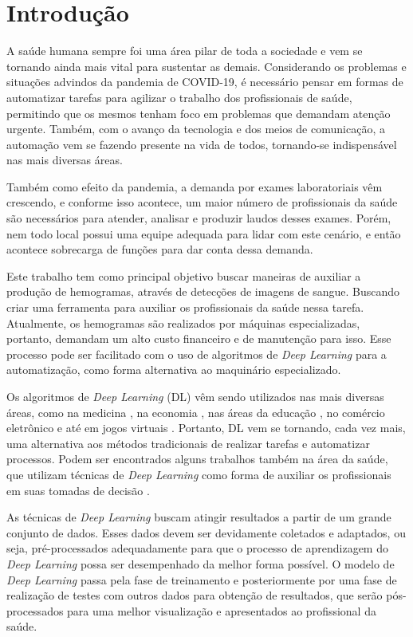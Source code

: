 \chapter{Introdução}
\label{chap:introducao}
A saúde humana sempre foi uma área pilar de toda a sociedade e vem se tornando ainda mais vital para sustentar as demais. Considerando os problemas e situações advindos da pandemia de COVID-19, é necessário pensar em formas de automatizar tarefas para agilizar o trabalho dos profissionais de saúde, permitindo que os mesmos tenham foco em problemas que demandam atenção urgente. Também, com o avanço da tecnologia e dos meios de comunicação, a automação vem se fazendo presente na vida de todos, tornando-se indispensável nas mais diversas áreas.

Também como efeito da pandemia, a demanda por exames laboratoriais vêm crescendo, e conforme isso acontece, um maior número de profissionais da saúde são necessários para atender, analisar e produzir laudos desses exames. Porém, nem todo local possui uma equipe adequada para lidar com este cenário, e então acontece sobrecarga de funções para dar conta dessa demanda.

Este trabalho tem como principal objetivo buscar maneiras de auxiliar a produção de hemogramas, através de detecções de imagens de sangue. Buscando criar uma ferramenta para auxiliar os profissionais da saúde nessa tarefa. Atualmente, os hemogramas são realizados por máquinas especializadas, portanto, demandam um alto custo financeiro e de manutenção para isso. Esse processo pode ser facilitado com o uso de algoritmos de \emph{Deep Learning} para a automatização, como forma alternativa ao maquinário especializado.

Os algoritmos de \emph{Deep Learning} (DL) vêm sendo utilizados nas mais diversas áreas, como na medicina \cite{deepLearningMedicine}, na economia \cite{deepLearningEconomy}, nas áreas da educação \cite{deepLearningEducation}, no comércio eletrônico \cite{deepLearningEcommerce} e até em jogos virtuais \cite{deepLearningGaming}. Portanto, DL vem se tornando, cada vez mais, uma alternativa aos métodos tradicionais de realizar tarefas e automatizar processos. Podem ser encontrados alguns trabalhos também na área da saúde, que utilizam técnicas de \emph{Deep Learning} como forma de auxiliar os profissionais em suas tomadas de decisão \cite{deepLearningHealth1, deepLearningHealth2}.

As técnicas de \emph{Deep Learning} buscam atingir resultados a partir de um grande conjunto de dados. Esses dados devem ser devidamente coletados e adaptados, ou seja, pré-processados adequadamente para que o processo de aprendizagem do \emph{Deep Learning} possa ser desempenhado da melhor forma possível. O modelo de \emph{Deep Learning} passa pela fase de treinamento e posteriormente por uma fase de realização de testes com outros dados para obtenção de resultados, que serão pós-processados para uma melhor visualização e apresentados ao profissional da saúde.

